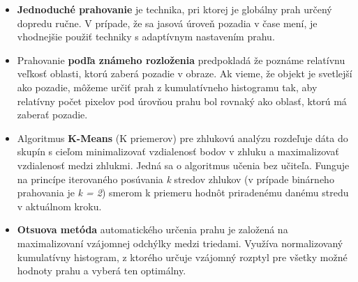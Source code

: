     \begin{itemize}
        \item \textbf{Jednoduché prahovanie} je technika, pri ktorej je globálny prah určený dopredu ručne. V prípade, že sa jasová úroveň pozadia v čase mení, je vhodnejšie použiť techniky s adaptívnym nastavením prahu.

        \item Prahovanie \textbf{podľa známeho rozloženia} predpokladá že poznáme relatívnu veľkosť oblasti, ktorú zaberá pozadie v obraze. Ak vieme, že objekt je svetlejší ako pozadie, môžeme určiť prah z kumulatívneho histogramu tak, aby relatívny počet pixelov pod úrovňou prahu bol rovnaký ako oblasť, ktorú má zaberať pozadie.

        \item Algoritmus \textbf{K-Means} (K priemerov) pre zhlukovú analýzu rozdeľuje dáta do skupín s cieľom minimalizovať vzdialenosť bodov v zhluku a maximalizovať vzdialenosť medzi zhlukmi. Jedná sa o algoritmus učenia bez učiteľa. Funguje na princípe iterovaného posúvania \emph{k} stredov zhlukov (v prípade binárneho prahovania je \emph{k = 2}) smerom k priemeru hodnôt priradenému danému stredu v aktuálnom kroku.

        \item \textbf{Otsuova metóda} automatického určenia prahu je založená na maximalizovaní vzájomnej odchýlky medzi triedami. Využíva normalizovaný kumulatívny histogram, z ktorého určuje vzájomný rozptyl pre všetky možné hodnoty prahu a vyberá ten optimálny.
    \end{itemize}

